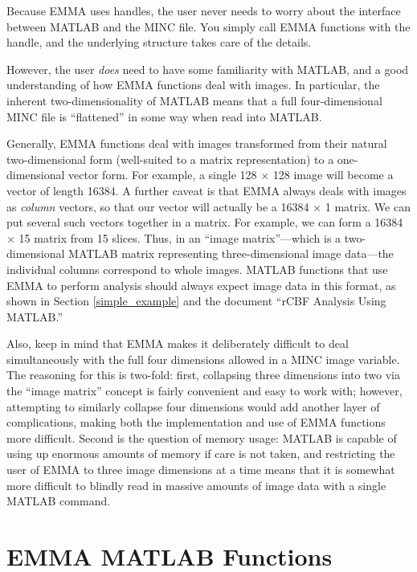 Because EMMA uses handles, the user never needs to worry about the
interface between MATLAB and the MINC file.  You simply call EMMA
functions with the handle, and the underlying structure takes care of
the details.

However, the user {\em does} need to have some familiarity with
MATLAB, and a good understanding of how EMMA functions deal with
images.  In particular, the inherent two-dimensionality of MATLAB
means that a full four-dimensional MINC file is ``flattened'' in some
way when read into MATLAB.

\label{explain_images}
Generally, EMMA functions deal with images transformed from their
natural two-dimensional form (well-suited to a matrix representation)
to a one-dimensional vector form.  For example, a single 128 $\times$
128 image will become a vector of length 16384.  A further caveat is
that EMMA always deals with images as {\em column} vectors, so that
our vector will actually be a 16384 $\times$ 1 matrix.  We can put
several such vectors together in a matrix.  For example, we can form
a 16384 $\times$ 15 matrix from 15 slices.  Thus, in an ``image
matrix''---which is a two-dimensional MATLAB matrix representing
three-dimensional image data---the individual columns correspond to
whole images.  MATLAB functions that use EMMA to perform analysis
should always expect image data in this format, as shown in Section
\ref{simple_example} and the document ``rCBF Analysis Using MATLAB.''

Also, keep in mind that EMMA makes it deliberately difficult to deal
simultaneously with the full four dimensions allowed in a MINC image
variable.  The reasoning for this is two-fold: first, collapsing three
dimensions into two via the ``image matrix'' concept is fairly
convenient and easy to work with; however, attempting to similarly
collapse four dimensions would add another layer of complications,
making both the implementation and use of EMMA functions more
difficult.  Second is the question of memory usage: MATLAB is capable
of using up enormous amounts of memory if care is not taken, and
restricting the user of EMMA to three image dimensions at a time means
that it is somewhat more difficult to blindly read in massive amounts
of image data with a single MATLAB command.

\newpage
\section{EMMA MATLAB Functions}

